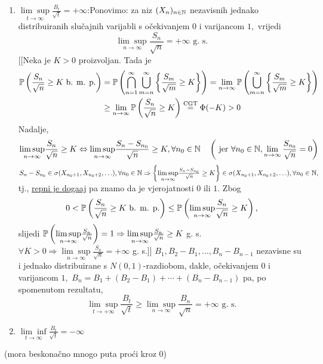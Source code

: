 \documentclass{article}
\begin{document}
\begin{enumerate}
\begin{enumerate}
\begin{enumerate}
            \item[] \(\underset{t\to\infty}{\lim\sup}\frac{B_t}{\sqrt t}=+\infty\):\newline\newline Ponovimo: za niz \((X_n)_{n\in\Bbb N}\) nezavisnih jednako distribuiranih slučajnih varijabli s očekivanjem \(0\) i varijancom \(1,\) vrijedi \[\underset{n\to\infty}{\lim\sup}\frac{S_n}{\sqrt n}=+\infty\text{ g. s.}\] [[Neka je \(K>0\) proizvoljan. Tada je \[\begin{aligned}\Bbb P\left(\frac{S_n}{\sqrt n}\ge K\text{ b. m. p.}\right)&=\Bbb P\left(\bigcap_{n=1}^\infty\bigcup_{m=n}^\infty\left\{\frac{S_m}{\sqrt m}\ge K\right\}\right)=\lim\limits_{n\to\infty}\Bbb P\left(\bigcup_{m=n}^\infty\left\{\frac{S_m}{\sqrt m}\ge K\right\}\right)\\&\ge\lim\limits_{n\to\infty}\Bbb P\left(\frac{S_n}{\sqrt n}\ge K\right)\overset{\text{CGT}}{=}\Phi(-K)>0\end{aligned}\] Nadalje, \[\underset{n\to\infty}{\lim\sup}\frac{S_n}{\sqrt n}\ge K\Leftrightarrow\underset{n\to\infty}{\lim\sup}\frac{S_n-S_{n_0}}{\sqrt n}\ge K,\forall n_0\in\Bbb N\quad\left(\text{ jer }\forall n_0\in\Bbb N,\lim_{n\to\infty}\frac{S_{n_0}}{\sqrt n}=0\right)\] \(S_n-S_{n_0}\in\sigma(X_{n_0+1},X_{n_0+2},\ldots),\forall n_0\in\Bbb N\Rightarrow\left\{\underset{n\to\infty}{\lim\sup}\frac{S_n-S_{n_0}}{\sqrt n}\ge K\right\}\in\sigma(X_{n_0+1},X_{n_0+2},\ldots),\forall n_0\in\Bbb N,\) tj., \underline{repni je doga\dj{}aj} pa znamo da je vjerojatnosti \(0\) ili \(1.\) Zbog \[0<\Bbb P\left(\frac{S_n}{\sqrt n}\ge K\text{ b. m. p.}\right)\le\Bbb P\left(\underset{n\to\infty}{\lim\sup}\frac{S_n}{\sqrt n}\ge K\right),\] slijedi \(\Bbb P\left(\underset{n\to\infty}{\lim\sup}\frac{S_n}{\sqrt n}\right)=1\Rightarrow\underset{n\to\infty}{\lim\sup}\frac{S_n}{\sqrt n}\ge K\) g. s. \(\forall K>0\Rightarrow\underset{n\to\infty}{\lim\sup}\frac{S_n}{\sqrt n}=+\infty\) g. s.]] \(B_1,B_2-B_1,\ldots,B_n-B_{n-1}\) nezavisne su i jednako distribuirane s \(N(0,1)\)-razdiobom, dakle, očekivanjem \(0\) i varijancom \(1,\) \(B_n=B_1+(B_2-B_1)+\cdots+(B_n-B_{n-1})\) pa, po spomenutom rezultatu, \[\underset{t\to+\infty}{\lim\sup}\frac{B_t}{\sqrt t}\ge\underset{n\to\infty}{\lim\sup}\frac{B_n}{\sqrt n}=+\infty\text{ g. s.}\]
            \item[] \(\underset{t\to\infty}{\lim\inf}\frac{B_t}{\sqrt t}=-\infty\) 
        \end{enumerate}(mora beskonačno mnogo puta proći kroz \(0\)) 
    \end{enumerate}

\end{enumerate}
\end{document}
